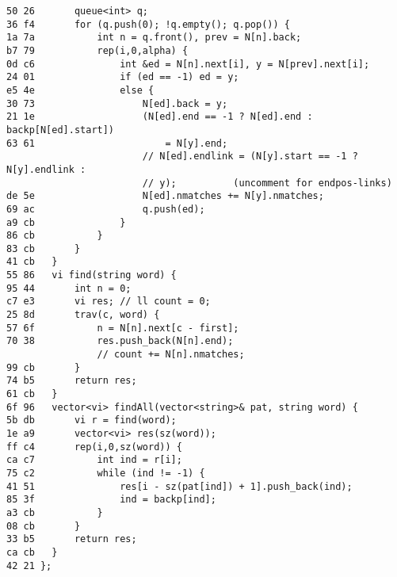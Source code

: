 \documentclass[11pt, a4paper, twoside]{article}
\begin{document}
\begin{lstlisting}
50 26 		queue<int> q;
36 f4 		for (q.push(0); !q.empty(); q.pop()) {
1a 7a 			int n = q.front(), prev = N[n].back;
b7 79 			rep(i,0,alpha) {
0d c6 				int &ed = N[n].next[i], y = N[prev].next[i];
24 01 				if (ed == -1) ed = y;
e5 4e 				else {
30 73 					N[ed].back = y;
21 1e 					(N[ed].end == -1 ? N[ed].end : backp[N[ed].start])
63 61 						= N[y].end;
      					// N[ed].endlink = (N[y].start == -1 ? N[y].endlink : 
      					// y);			(uncomment for endpos-links)			
de 5e 					N[ed].nmatches += N[y].nmatches;
69 ac 					q.push(ed);
a9 cb 				}
86 cb 			}
83 cb 		}
41 cb 	}
55 86 	vi find(string word) {
95 44 		int n = 0;
c7 e3 		vi res; // ll count = 0;
25 8d 		trav(c, word) {
57 6f 			n = N[n].next[c - first];
70 38 			res.push_back(N[n].end);
      			// count += N[n].nmatches;
99 cb 		}
74 b5 		return res;
61 cb 	}
6f 96 	vector<vi> findAll(vector<string>& pat, string word) {
5b db 		vi r = find(word);
1e a9 		vector<vi> res(sz(word));
ff c4 		rep(i,0,sz(word)) {
ca c7 			int ind = r[i];
75 c2 			while (ind != -1) {
41 51 				res[i - sz(pat[ind]) + 1].push_back(ind);
85 3f 				ind = backp[ind];
a3 cb 			}
08 cb 		}
33 b5 		return res;
ca cb 	}
42 21 };
\end{lstlisting}
\end{document}
